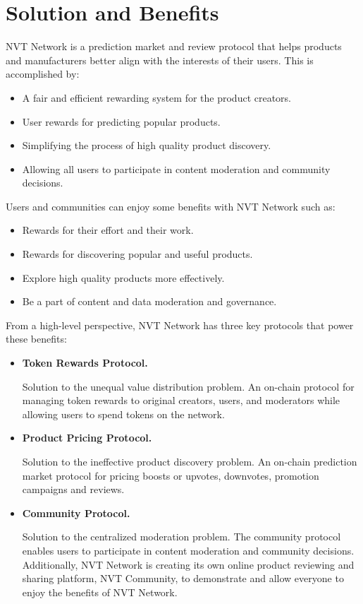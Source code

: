 \section{Solution and Benefits}
NVT Network is a prediction market and review protocol that helps products and manufacturers better align with the interests of their users. This is accomplished by:

\begin{itemize}
\item A fair and efficient rewarding system for the product creators.
\item User rewards for predicting popular products.
\item Simplifying the process of high quality product discovery.
\item Allowing all users to participate in content moderation and community decisions.
\end{itemize}

Users and communities can enjoy some benefits with NVT Network such as:

\begin{itemize}
\item Rewards for their effort and their work.
\item Rewards for discovering popular and useful products.
\item Explore high quality products more effectively.
\item Be a part of content and data moderation and governance.
\end{itemize}

From a high-level perspective, NVT Network has three key protocols that power these benefits:

\begin{itemize}
\item \textbf{Token Rewards Protocol.}

Solution to the unequal value distribution problem. An on-chain protocol for managing token rewards to original creators, users, and moderators while allowing users to spend tokens on the network. 

\item \textbf{Product Pricing Protocol.}

Solution to the ineffective product discovery problem. An on-chain prediction market protocol for pricing boosts or upvotes, downvotes, promotion campaigns and reviews.

\item \textbf{Community Protocol.}

Solution to the centralized moderation problem. The community protocol enables users to participate in content moderation and community decisions. Additionally, NVT Network is creating its own online product reviewing and sharing platform, NVT Community, to demonstrate and allow everyone to enjoy the benefits of NVT Network.

\end{itemize}

